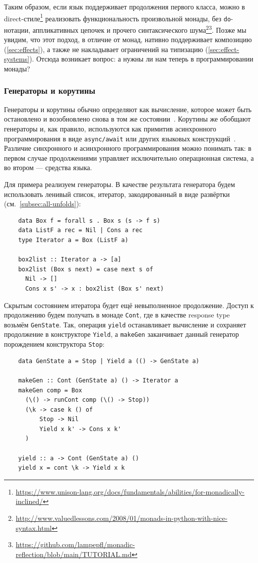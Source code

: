 Таким образом, если язык поддерживает продолжения первого класса, можно в direct-стиле\footnote{\url{https://www.unison-lang.org/docs/fundamentals/abilities/for-monadically-inclined/}} реализовать функциональность произвольной монады, без \texttt{do}-нотации, аппликативных цепочек и прочего синтаксического шума\footnote{\url{http://www.valuedlessons.com/2008/01/monads-in-python-with-nice-syntax.html}}\footnote{\url{https://github.com/lampepfl/monadic-reflection/blob/main/TUTORIAL.md}}.
Позже мы увидим, что этот подход, в отличие от монад, нативно поддерживает композицию (\ref{sec:effects}), а также не накладывает ограничений на типизацию (\ref{sec:effect-systems}).
Отсюда возникает вопрос: а нужны ли нам теперь в программировании монады?

\subsubsection{Генераторы и корутины} \label{subsubsec:generators-coroutines}

Генераторы и корутины обычно определяют как вычисление, которое может быть остановлено и возобновлено снова в том же состоянии~\cite{moura2009revisiting}.
Корутины же обобщают генераторы и, как правило, используются как примитив асинхронного программирования в виде \texttt{async/await} или других языковых конструкций~\cite{elizarov2021kotlin}.
Различие синхронного и асинхронного программирования можно понимать так: в первом случае продолжениями управляет исключительно операционная система, а во втором --- средства языка.

Для примера реализуем генераторы.
В качестве результата генератора будем использовать ленивый список, итератор, закодированный в виде развёртки (см.\ \ref{subsec:all-unfolds}):
\begin{verbatim}
    data Box f = forall s . Box s (s -> f s)
    data ListF a rec = Nil | Cons a rec
    type Iterator a = Box (ListF a)

    box2list :: Iterator a -> [a]
    box2list (Box s next) = case next s of
      Nil -> []
      Cons x s' -> x : box2list (Box s' next)
\end{verbatim}

Скрытым состоянием итератора будет ещё невыполненное продолжение.
Доступ к продолжению будем получать в монаде \texttt{Cont}, где в качестве response type возьмём \texttt{GenState}.
Так, операция \texttt{yield} останавливает вычисление и сохраняет продолжение в конструкторе \texttt{Yield}, а \texttt{makeGen} заканчивает данный генератор порождением конструктора \texttt{Stop}:
\begin{verbatim}
    data GenState a = Stop | Yield a (() -> GenState a)

    makeGen :: Cont (GenState a) () -> Iterator a
    makeGen comp = Box
      (\() -> runCont comp (\() -> Stop))
      (\k -> case k () of
          Stop -> Nil
          Yield x k' -> Cons x k'
      )

    yield :: a -> Cont (GenState a) ()
    yield x = cont \k -> Yield x k
\end{verbatim}

